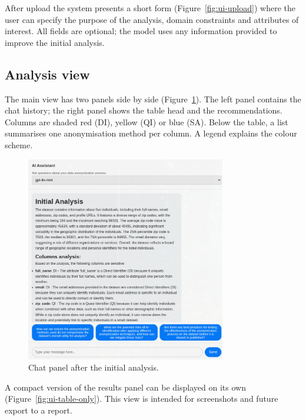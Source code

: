 \documentclass{article}
\begin{document}
After upload the system presents a short form (Figure~\ref{fig:ui-upload}) where the user can specify the purpose of the analysis, domain constraints and attributes of interest.  
All fields are optional; the model uses any information provided to improve the initial analysis.

\subsection{Analysis view}

The main view has two panels side by side (Figure~\ref{fig:ui-chat-results}).  
The left panel contains the chat history; the right panel shows the table head and the recommendations.  
Columns are shaded red (DI), yellow (QI) or blue (SA).  
Below the table, a list summarises one anonymisation method per column.  
A legend explains the colour scheme.

\begin{figure}[!htbp]
    \centering
    \includegraphics[height=9cm,width=0.85\linewidth,keepaspectratio]{images/chat_ui.jpg}
    \caption{Chat panel after the initial analysis.}
    \label{fig:ui-chat-results}
\end{figure}

A compact version of the results panel can be displayed on its own (Figure~\ref{fig:ui-table-only}).  
This view is intended for screenshots and future export to a report.
\end{document}
